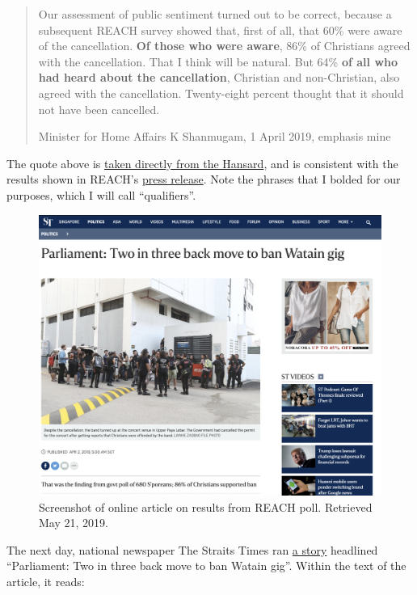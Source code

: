 \documentclass[openany]{book}
\begin{document}
\begin{quote}
Our assessment of public sentiment turned out to be correct, because a
subsequent REACH survey showed that, first of all, that 60\% were aware
of the cancellation. \textbf{Of those who were aware}, 86\% of
Christians agreed with the cancellation. That I think will be natural.
But 64\% \textbf{of all who had heard about the cancellation}, Christian
and non-Christian, also agreed with the cancellation. Twenty-eight
percent thought that it should not have been cancelled.

Minister for Home Affairs K Shanmugam, 1 April 2019, emphasis mine
\end{quote}

The quote above is
\href{https://sprs.parl.gov.sg/search/sprs3topic?reportid=ministerial-statement-1170}{taken
directly from the Hansard}, and is consistent with the results shown in
REACH's
\href{https://www.reach.gov.sg/~/media/2019/press-release/findings-of-poll-on-watain-concert--1-april-2019.pdf}{press
release}. Note the phrases that I bolded for our purposes, which I will
call ``qualifiers''.

\begin{figure}

{\centering \includegraphics[width=0.8\linewidth]{images/proportion/STwatain} 

}

\caption{Screenshot of online article on results from REACH poll. Retrieved May 21, 2019.}\label{fig:st-watain}
\end{figure}

The next day, national newspaper The Straits Times ran
\href{https://www.straitstimes.com/politics/singapolitics/parliament-two-out-of-three-singaporeans-back-governments-move-to-cancel}{a
story} headlined ``Parliament: Two in three back move to ban Watain
gig''. Within the text of the article, it reads:
\end{document}

